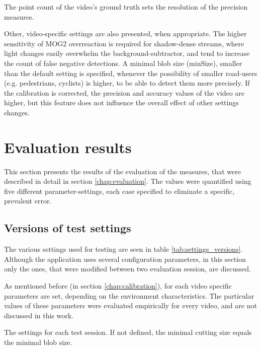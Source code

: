 The point count of the video's ground truth sets the resolution of the precision measures.

Other, video-specific settings are also presented, when appropriate.
The higher sensitivity of MOG2 overreaction is required for shadow-dense streams, where light changes easily overwhelm the background-subtractor, and tend to increase the count of false negative detections.
A minimal blob size (minSize), smaller than the default setting is specified, whenever the possibility of smaller road-users (e.g. pedestrians, cyclists) is higher, to be able to detect them more precisely.
If the calibration is corrected, the precision and accuracy values of the video are higher, but this feature does not influence the overall effect of other settings changes. 
\FloatBarrier

\section{Evaluation results}\label{sec:evaluation_results}
This section presents the results of the evaluation of the measures, that were described in detail in section \ref{chap:evaluation}.
The values were quantified using five different parameter-settings, each case specified to eliminate a specific, prevalent error.

\subsection{Versions of test settings}
The various settings used for testing are seen in table \ref{tab:settings_versions}.
Although the application uses several configuration parameters, in this section only the ones, that were modified between two evaluation session, are discussed.

As mentioned before (in section \ref{chap:calibration}), for each video specific parameters are set, depending on the environment characteristics.
The particular values of these parameters were evaluated empirically for every video, and are not discussed in this work.

\begin{table}[!h]
	\begin{adjustbox}{center}
	\end{adjustbox}
	\caption{The settings for each test session. If not defined, the minimal cutting size equals the minimal blob size.}
	\label{tab:settings_versions}
\end{table}

